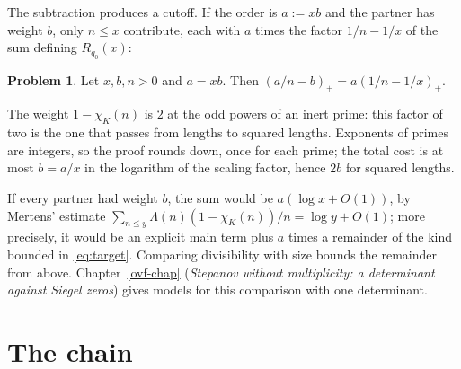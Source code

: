 \documentclass[reqno]{amsart}
\newcounter{chap}
\theoremstyle{definition}
\newtheorem{problem}{Problem}[section]
\begin{document}
The subtraction produces a cutoff.  If the order is \(a := xb\) and
the partner has weight \(b\), only \(n \le x\) contribute, each
with \(a\) times the factor \(1/n - 1/x\) of the sum defining
\(R_{q_0}(x)\):

\begin{problem}\label{pr:ramp}
  Let \(x, b, n > 0\) and \(a = xb\).  Then
  \((a/n - b)_+ = a (1/n - 1/x)_+\).
\end{problem}

The weight \(1 - \chi_K(n)\) is \(2\) at the odd powers of an inert
prime: this factor of two is the one that passes from lengths to
squared lengths.  Exponents of primes are integers, so the proof
rounds down, once for each prime; the total cost is at most
\(b = a/x\) in the logarithm of the scaling factor, hence \(2b\)
for squared lengths.

If every partner had weight \(b\), the sum would be
\(a (\log x + O(1))\), by Mertens' estimate
\(\sum_{n \le y} \Lambda(n)(1 - \chi_K(n))/n = \log y + O(1)\); more
precisely, it would be an explicit main term plus \(a\) times a
remainder of the kind bounded in \eqref{eq:target}.  Comparing
divisibility with size bounds the remainder from above.
Chapter~\ref{ovf-chap} (\emph{Stepanov without multiplicity: a determinant against Siegel zeros})
gives models for this comparison with one determinant.

\section{The chain}\label{sec:chain}
\end{document}
